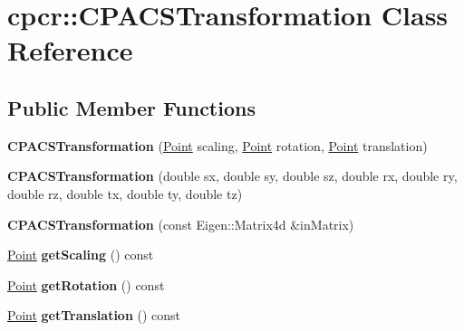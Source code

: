 \hypertarget{classcpcr_1_1CPACSTransformation}{\section{cpcr\-:\-:C\-P\-A\-C\-S\-Transformation Class Reference}
\label{classcpcr_1_1CPACSTransformation}
}
\subsection*{Public Member Functions}
\begin{DoxyCompactItemize}
\item 
\hypertarget{classcpcr_1_1CPACSTransformation_ae80469b82fe2e7c0ce478eca7b805b01}{{\bfseries C\-P\-A\-C\-S\-Transformation} (\hyperlink{classcpcr_1_1Point}{Point} scaling, \hyperlink{classcpcr_1_1Point}{Point} rotation, \hyperlink{classcpcr_1_1Point}{Point} translation)}\label{classcpcr_1_1CPACSTransformation_ae80469b82fe2e7c0ce478eca7b805b01}

\item 
\hypertarget{classcpcr_1_1CPACSTransformation_a858cedfd3363cac2725fffeddee8f7c6}{{\bfseries C\-P\-A\-C\-S\-Transformation} (double sx, double sy, double sz, double rx, double ry, double rz, double tx, double ty, double tz)}\label{classcpcr_1_1CPACSTransformation_a858cedfd3363cac2725fffeddee8f7c6}

\item 
\hypertarget{classcpcr_1_1CPACSTransformation_a8b0efee9cb4de5449a2ebd64fdd29b3c}{{\bfseries C\-P\-A\-C\-S\-Transformation} (const Eigen\-::\-Matrix4d \&in\-Matrix)}\label{classcpcr_1_1CPACSTransformation_a8b0efee9cb4de5449a2ebd64fdd29b3c}

\item 
\hypertarget{classcpcr_1_1CPACSTransformation_a4564f0676d5594c71f57b0a920303346}{\hyperlink{classcpcr_1_1Point}{Point} {\bfseries get\-Scaling} () const }\label{classcpcr_1_1CPACSTransformation_a4564f0676d5594c71f57b0a920303346}

\item 
\hypertarget{classcpcr_1_1CPACSTransformation_ac4b74b3e46678b5771806a3630b4ea97}{\hyperlink{classcpcr_1_1Point}{Point} {\bfseries get\-Rotation} () const }\label{classcpcr_1_1CPACSTransformation_ac4b74b3e46678b5771806a3630b4ea97}

\item 
\hypertarget{classcpcr_1_1CPACSTransformation_aa78a2310210b78d893772396cb3971c0}{\hyperlink{classcpcr_1_1Point}{Point} {\bfseries get\-Translation} () const }\label{classcpcr_1_1CPACSTransformation_aa78a2310210b78d893772396cb3971c0}


\end{DoxyCompactItemize}
